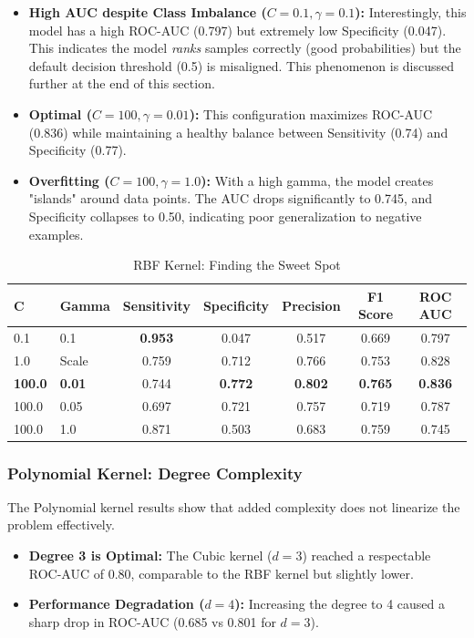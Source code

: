 \documentclass[12pt,a4paper]{article}
\begin{document}
\begin{itemize}
    \item \textbf{High AUC despite Class Imbalance ($C=0.1, \gamma=0.1$):} Interestingly, this model has a high ROC-AUC (0.797) but extremely low Specificity (0.047). This indicates the model \textit{ranks} samples correctly (good probabilities) but the default decision threshold (0.5) is misaligned. This phenomenon is discussed further at the end of this section.
    \item \textbf{Optimal ($C=100, \gamma=0.01$):} This configuration maximizes ROC-AUC (0.836) while maintaining a healthy balance between Sensitivity (0.74) and Specificity (0.77).
    \item \textbf{Overfitting ($C=100, \gamma=1.0$):} With a high gamma, the model creates "islands" around data points. The AUC drops significantly to 0.745, and Specificity collapses to 0.50, indicating poor generalization to negative examples.
\end{itemize}

\begin{table}[h!]
\centering
\begin{tabular}{llccccc}
\toprule
\textbf{C} & \textbf{Gamma} & \textbf{Sensitivity} & \textbf{Specificity} & \textbf{Precision} & \textbf{F1 Score} & \textbf{ROC AUC} \\
\midrule
0.1 & 0.1 & \textbf{0.953} & 0.047 & 0.517 & 0.669 & 0.797 \\
1.0 & Scale & 0.759 & 0.712 & 0.766 & 0.753 & 0.828 \\
\rowcolor{gray!10} \textbf{100.0} & \textbf{0.01} & 0.744 & \textbf{0.772} & \textbf{0.802} & \textbf{0.765} & \textbf{0.836} \\
100.0 & 0.05 & 0.697 & 0.721 & 0.757 & 0.719 & 0.787 \\
100.0 & 1.0 & 0.871 & 0.503 & 0.683 & 0.759 & 0.745 \\
\bottomrule
\end{tabular}
\caption{RBF Kernel: Finding the Sweet Spot}
\end{table}

\subsubsection*{Polynomial Kernel: Degree Complexity}
The Polynomial kernel results show that added complexity does not linearize the problem effectively.

\begin{itemize}
    \item \textbf{Degree 3 is Optimal:} The Cubic kernel ($d=3$) reached a respectable ROC-AUC of 0.80, comparable to the RBF kernel but slightly lower.
    \item \textbf{Performance Degradation ($d=4$):} Increasing the degree to 4 caused a sharp drop in ROC-AUC (0.685 vs 0.801 for $d=3$).
\end{itemize}
\end{document}
